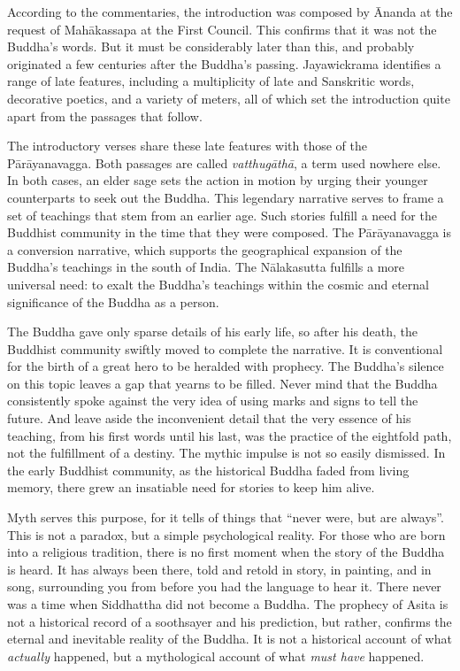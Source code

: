 \documentclass[12pt,openany]{book}%
\begin{document}
According to the commentaries, the introduction was composed by Ānanda at the request of \textsanskrit{Mahākassapa} at the First Council. This confirms that it was not the Buddha’s words. But it must be considerably later than this, and probably originated a few centuries after the Buddha’s passing. Jayawickrama identifies a range of late features, including a multiplicity of late and Sanskritic words, decorative poetics, and a variety of meters, all of which set the introduction quite apart from the passages that follow.

The introductory verses share these late features with those of the \textsanskrit{Pārāyanavagga}. Both passages are called \textit{\textsanskrit{vatthugāthā}}, a term used nowhere else. In both cases, an elder sage sets the action in motion by urging their younger counterparts to seek out the Buddha. This legendary narrative serves to frame a set of teachings that stem from an earlier age. Such stories fulfill a need for the Buddhist community in the time that they were composed. The \textsanskrit{Pārāyanavagga} is a conversion narrative, which supports the geographical expansion of the Buddha’s teachings in the south of India. The \textsanskrit{Nālakasutta} fulfills a more universal need: to exalt the Buddha’s teachings within the cosmic and eternal significance of the Buddha as a person.

The Buddha gave only sparse details of his early life, so after his death, the Buddhist community swiftly moved to complete the narrative. It is conventional for the birth of a great hero to be heralded with prophecy. The Buddha’s silence on this topic leaves a gap that yearns to be filled. Never mind that the Buddha consistently spoke against the very idea of using marks and signs to tell the future. And leave aside the inconvenient detail that the very essence of his teaching, from his first words until his last, was the practice of the eightfold path, not the fulfillment of a destiny. The mythic impulse is not so easily dismissed. In the early Buddhist community, as the historical Buddha faded from living memory, there grew an insatiable need for stories to keep him alive.

Myth serves this purpose, for it tells of things that “never were, but are always”. This is not a paradox, but a simple psychological reality. For those who are born into a religious tradition, there is no first moment when the story of the Buddha is heard. It has always been there, told and retold in story, in painting, and in song, surrounding you from before you had the language to hear it. There never was a time when Siddhattha did not become a Buddha. The prophecy of Asita is not a historical record of a soothsayer and his prediction, but rather, confirms the eternal and inevitable reality of the Buddha. It is not a historical account of what \emph{actually} happened, but a mythological account of what \emph{must have} happened.
\end{document}
